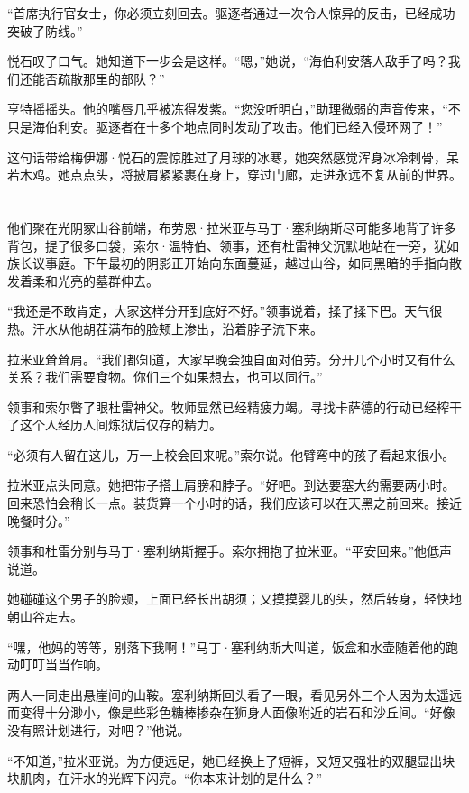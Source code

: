 \documentclass[AutoFakeBold=true]{book}
\begin{document}
``首席执行官女士，你必须立刻回去。驱逐者通过一次令人惊异的反击，已经成功突破了防线。''

悦石叹了口气。她知道下一步会是这样。``嗯，''她说，``海伯利安落人敌手了吗？我们还能否疏散那里的部队？''

亨特摇摇头。他的嘴唇几乎被冻得发紫。``您没听明白，''助理微弱的声音传来，``不只是海伯利安。驱逐者在十多个地点同时发动了攻击。{\kaishu 他们已经入侵环网了！}''

这句话带给梅伊娜·悦石的震惊胜过了月球的冰寒，她突然感觉浑身冰冷刺骨，呆若木鸡。她点点头，将披肩紧紧裹在身上，穿过门廊，走进永远不复从前的世界。

\chapter{}

他们聚在光阴冢山谷前端，布劳恩·拉米亚与马丁·塞利纳斯尽可能多地背了许多背包，提了很多口袋，索尔·温特伯、领事，还有杜雷神父沉默地站在一旁，犹如族长议事庭。下午最初的阴影正开始向东面蔓延，越过山谷，如同黑暗的手指向散发着柔和光亮的墓群伸去。

``我还是不敢肯定，大家这样分开到底好不好。''领事说着，揉了揉下巴。天气很热。汗水从他胡茬满布的脸颊上渗出，沿着脖子流下来。

拉米亚耸耸肩。``我们都知道，大家早晚会独自面对伯劳。分开几个小时又有什么关系？我们需要食物。你们三个如果想去，也可以同行。''

领事和索尔瞥了眼杜雷神父。牧师显然已经精疲力竭。寻找卡萨德的行动已经榨干了这个人经历人间炼狱后仅存的精力。

``必须有人留在这儿，万一上校会回来呢。''索尔说。他臂弯中的孩子看起来很小。

拉米亚点头同意。她把带子搭上肩膀和脖子。``好吧。到达要塞大约需要两小时。回来恐怕会稍长一点。装货算一个小时的话，我们应该可以在天黑之前回来。接近晚餐时分。''

领事和杜雷分别与马丁·塞利纳斯握手。索尔拥抱了拉米亚。``平安回来。''他低声说道。

她碰碰这个男子的脸颊，上面已经长出胡须；又摸摸婴儿的头，然后转身，轻快地朝山谷走去。

``嘿，他妈的等等，别落下我啊！''马丁·塞利纳斯大叫道，饭盒和水壶随着他的跑动叮叮当当作响。

两人一同走出悬崖间的山鞍。塞利纳斯回头看了一眼，看见另外三个人因为太遥远而变得十分渺小，像是些彩色糖棒掺杂在狮身人面像附近的岩石和沙丘间。``好像没有照计划进行，对吧？''他说。

``不知道，''拉米亚说。为方便远足，她已经换上了短裤，又短又强壮的双腿显出块块肌肉，在汗水的光辉下闪亮。``你本来计划的是什么？''
\end{document}
